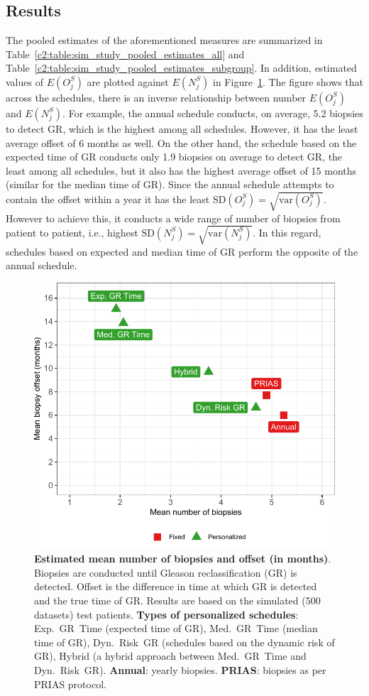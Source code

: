 \subsection{Results}
The pooled estimates of the aforementioned measures are summarized in Table~\ref{c2:table:sim_study_pooled_estimates_all} and Table~\ref{c2:table:sim_study_pooled_estimates_subgroup}. In addition, estimated values of $E(O^S_j)$ are plotted against $E(N^S_j)$ in Figure~\ref{c2:fig:3}. The figure shows that across the schedules, there is an inverse relationship between number $E(O^S_j)$ and $E(N^S_j)$. For example, the annual schedule conducts, on average, 5.2 biopsies to detect GR, which is the highest among all schedules. However, it has the least average offset of 6 months as well. On the other hand, the schedule based on the expected time of GR conducts only 1.9 biopsies on average to detect GR, the least among all schedules, but it also has the highest average offset of 15 months (similar for the median time of GR). Since the annual schedule attempts to contain the offset within a year it has the least $\mbox{SD}(O^S_j) = \sqrt{\mbox{var}(O^S_j)}$. However to achieve this, it conducts a wide range of number of biopsies from patient to patient, i.e., highest $\mbox{SD}(N^S_j) = \sqrt{\mbox{var}(N^S_j)}$. In this regard, schedules based on expected and median time of GR perform the opposite of the annual schedule.

\begin{figure}
\includegraphics{contents/c2/images/c2_fig3.pdf}
\caption{\textbf{Estimated mean number of biopsies and offset (in months)}. Biopsies are conducted until Gleason reclassification (GR) is detected. Offset is the difference in time at which GR is detected and the true time of GR. Results are based on the simulated (500 datasets) test patients. \textbf{Types of personalized schedules}: Exp.~GR~Time (expected time of GR), Med.~GR~Time (median time of GR), Dyn.~Risk~GR (schedules based on the dynamic risk of GR), Hybrid (a hybrid approach between Med.~GR~Time and Dyn.~Risk~GR). \textbf{Annual}: yearly biopsies. \textbf{PRIAS}: biopsies as per PRIAS protocol.}
\label{c2:fig:3}
\end{figure}

